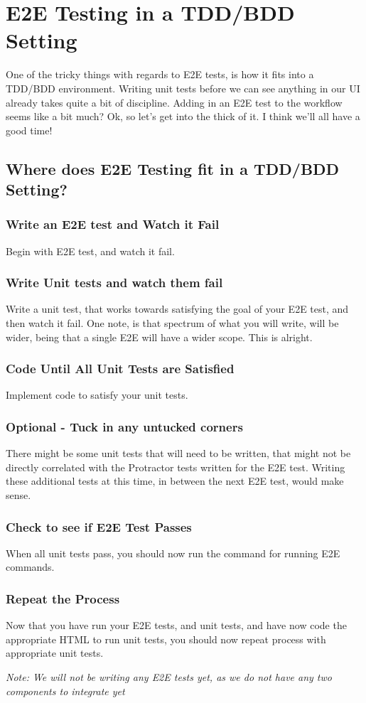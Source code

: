 
\chapter{ E2E Testing in a TDD/BDD Setting }

One of the tricky things with regards to E2E tests, is how it fits into a
TDD/BDD environment. Writing unit tests before we can see anything in our UI
already takes quite a bit of discipline. Adding in an E2E test to the workflow
seems like a bit much? Ok, so let's get into the thick of it. I think we'll all
have a good time!

\section{ Where does E2E Testing fit in a TDD/BDD Setting? }

\subsection{ Write an E2E test and Watch it Fail }
Begin with E2E test, and watch it fail.

\subsection{ Write Unit tests and watch them fail }
Write a unit test, that works towards satisfying the goal of your E2E test, and
then watch it fail. One note, is that spectrum of what you will write, will
be wider, being that a single E2E will have a wider scope. This is alright.

\subsection{ Code Until All Unit Tests are Satisfied }
Implement code to satisfy your unit tests.

\subsection{ Optional - Tuck in any untucked corners }
There might be some unit tests that will need to be written, that might not be
directly correlated with the Protractor tests written for the E2E test. Writing
these additional tests at this time, in between the next E2E test, would make
sense.

\subsection{ Check to see if E2E Test Passes }
When all unit tests pass, you should now run the command for running E2E
commands.

\subsection{ Repeat the Process }
Now that you have run your E2E tests, and unit tests, and have now code
the appropriate HTML to run unit tests, you should now repeat process with
appropriate unit tests.

\textit{Note: We will not be writing any E2E tests yet, as we do not have any
two components to integrate yet}
